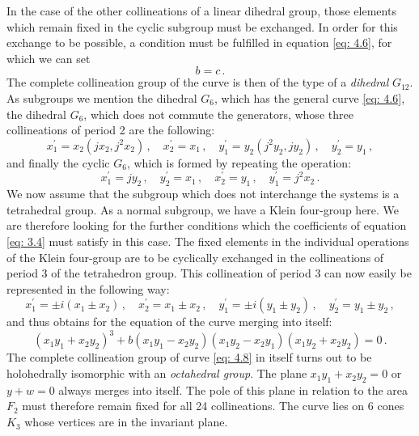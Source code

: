 \documentclass[leqno]{article}
\begin{document}
In the case of the other collineations of a linear dihedral group, those elements which remain fixed in the cyclic subgroup must be exchanged. In order for this exchange to be possible, a condition must be fulfilled in equation \eqref{eq: 4.6}, for which we can set 
\begin{equation}\label{eq: 4.7}
b=c \, . \tag{7}
\end{equation}
The complete collineation group of the curve is then of the type of a \textit{dihedral} $G_{12}$. As subgroups we mention the dihedral $G_6$, which has the general curve \eqref{eq: 4.6}, the dihedral $G_6$, which does not commute the generators, whose three collineations of period 2 are the following: 
\[
x_1^\prime = x_2( jx_2, j^2 x_2) \, , \quad x_2^\prime = x_1 \, , \quad y_1^\prime = y_2(j^2 y_2, j y_2) \, , \quad y_2^\prime = y_1 \, , 
\] 
and finally the cyclic $G_6$, which is formed by repeating the operation: 
\[
x_1^\prime = j y_2 \, , \quad y_2^\prime = x_1 \, , \quad x_2^\prime = y_1 \, , \quad y_1^\prime = j^2 x_2 \, . 
\]
We now assume that the subgroup which does not interchange the systems is a tetrahedral group. As a normal subgroup, we have a Klein four-group here. We are therefore looking for the further conditions which the coefficients of equation \eqref{eq: 3.4} must satisfy in this case. The fixed elements in the individual operations of the Klein four-group are to be cyclically exchanged in the collineations of period 3 of the tetrahedron group. This collineation of period 3 can now easily be represented in the following way:
\[
x_1^\prime = \pm i(x_1 \pm x_2) \, , \quad x_2^\prime = x_1 \pm x_2 \, , \quad y_1^\prime = \pm i (y_1 \pm y_2) \, , \quad y_2^\prime = y_1 \pm y_2 \, , 
\]
and thus obtains for the equation of the curve merging into itself:
\begin{equation}\label{eq: 4.8}
(x_1 y_1 + x_2 y_2)^3 + b(x_1 y_1 - x_2 y_2) (x_1 y_2 - x_2 y_1)( x_1 y_2 + x_2 y_2) = 0 \, . \tag{8}
\end{equation}
The complete collineation group of curve \eqref{eq: 4.8} in itself turns out to be holohedrally isomorphic with an \textit{octahedral group}. The plane $x_1 y_1 + x_2 y_2 = 0$ or $y+w=0$ always merges into itself. The pole of this plane in relation to the area $F_2$ must therefore remain fixed for all 24 collineations. The curve lies on 6 cones $K_3$ whose vertices are in the invariant plane.
\end{document}
